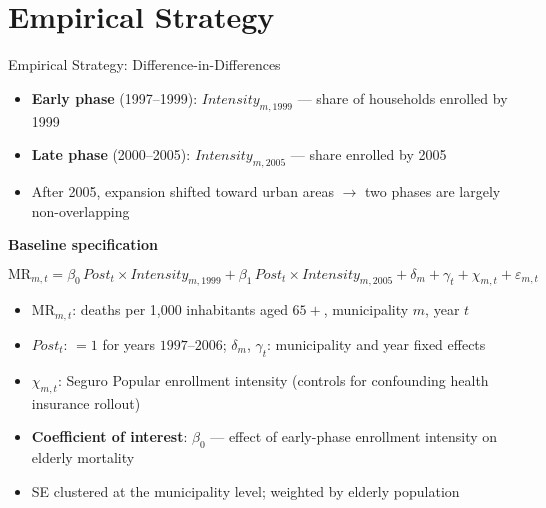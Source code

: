 \documentclass[aspectratio=169,usenames,dvipsnames]{beamer}
\begin{document}

\section{Empirical Strategy}

\begin{frame}{Empirical Strategy: Difference-in-Differences}\label{empirics}
\small



\begin{itemize}
  \item \textbf{Early phase} (1997--1999): $\textit{Intensity}_{m,1999}$ --- share of households enrolled by 1999
  \item \textbf{Late phase} (2000--2005): $\textit{Intensity}_{m,2005}$ --- share enrolled by 2005
  \item After 2005, expansion shifted toward urban areas $\to$ two phases are largely non-overlapping
\end{itemize}

\vspace{6pt}

\textbf{Baseline specification}

\vspace{-2pt}

\begin{equation*}
\text{MR}_{m,t}
= \beta_{0}\,\textit{Post}_{t} \times \textit{Intensity}_{m,1999}
+ \beta_{1}\,\textit{Post}_{t} \times \textit{Intensity}_{m,2005}
+ \delta_{m} + \gamma_{t} + \chi_{m,t} + \varepsilon_{m,t}
\end{equation*}

\vspace{4pt}

\begin{itemize}
  \item $\text{MR}_{m,t}$: deaths per 1,000 inhabitants aged $65+$, municipality $m$, year $t$
  \item $\textit{Post}_{t}$: $= 1$ for years $1997$--$2006$; $\delta_m$, $\gamma_t$: municipality and year fixed effects
  \item $\chi_{m,t}$: Seguro Popular enrollment intensity (controls for confounding health insurance rollout)
  \item \textbf{Coefficient of interest}: $\beta_0$ --- effect of early-phase enrollment intensity on elderly mortality
  \item SE clustered at the municipality level; weighted by elderly population
\end{itemize}

\end{frame}
\end{document}
